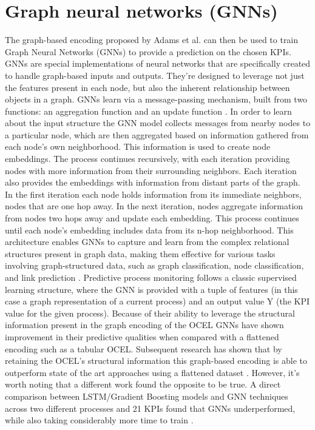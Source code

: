 \section{Graph neural networks (GNNs)}
\label{sec:rw_gnns}
    The graph-based encoding proposed by Adams et al.\cite{adams2022} can then be used to train Graph Neural Networks (GNNs) to provide a prediction on the chosen KPIs. 
    GNNs are special implementations of neural networks that are specifically created to handle graph-based inputs and outputs. They're designed to leverage not just the features present in each node, but also the inherent relationship between objects in a graph. GNNs learn via a message-passing mechanism, built from two functions: an aggregation function and an update function \cite{khemani2024}.
    In order to learn about the input structure the GNN model collects messages from nearby nodes to a particular node, which are then aggregated based on information gathered from each node's own neighborhood. This information is used to create node embeddings. The process continues recursively, with each iteration providing nodes with more information from their surrounding neighbors. Each iteration also provides the embeddings with information from distant parts of the graph. In the first iteration each node holds information from its immediate neighbors, nodes that are one hop away. In the next iteration, nodes aggregate information from nodes two hops away and update each embedding. This process continues until each node's embedding includes data from its n-hop neighborhood. 
    This architecture enables GNNs to capture and learn from the complex relational structures present in graph data, making them effective for various tasks involving graph-structured data, such as graph classification, node classification, and link prediction \cite{khemani2024}. 
    Predictive process monitoring follows a classic supervised learning structure, where the GNN is provided with a tuple of features (in this case a graph representation of a current process) and an output value Y (the KPI value for the given process). Because of their ability to leverage the structural information present in the graph encoding of the OCEL GNNs have shown improvement in their predictive qualities when compared with a flattened encoding such as a tabular OCEL.
    Subsequent research has shown that by retaining the OCEL's structural information this graph-based encoding is able to outperform state of the art approaches using a flattened dataset \cite{adams2023}. 
    However, it's worth noting that a different work found the opposite to be true. A direct comparison between LSTM/Gradient Boosting models and GNN techniques across two different processes and 21 KPIs found that GNNs underperformed, while also taking considerably more time to train \cite{galantiDeleoni2024}.

